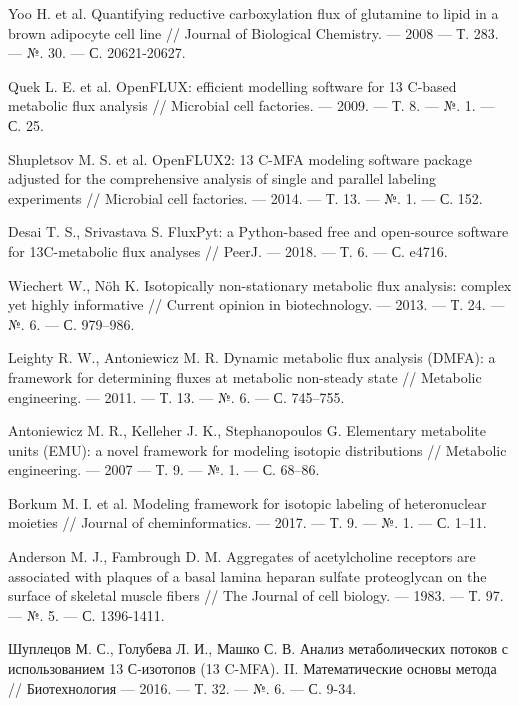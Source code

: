 \documentclass[14pt, a4paper]{extreport}
\begin{document}
\begin{thebibliography}{XXXX}
	Yoo H. et al. Quantifying reductive carboxylation flux of glutamine to lipid in a brown adipocyte cell line // Journal of Biological Chemistry. --- 2008 --- Т. 283. --- №. 30. --- С. 20621-20627.
	
	Quek L. E. et al. OpenFLUX: efficient modelling software for 13 C-based metabolic flux analysis // Microbial cell factories. --- 2009. --- Т. 8. --- №. 1. --- С. 25.
	
	Shupletsov M. S. et al. OpenFLUX2: 13 C-MFA modeling software package adjusted for the comprehensive analysis of single and parallel labeling experiments // Microbial cell factories. --- 2014. --- Т. 13. --- №. 1. --- С. 152.
	
	Desai T. S., Srivastava S. FluxPyt: a Python-based free and open-source software for 13C-metabolic flux analyses // PeerJ. --- 2018. --- Т. 6. --- С. e4716.
	
	Wiechert W., Nöh K. Isotopically non-stationary metabolic flux analysis: complex yet highly informative // Current opinion in biotechnology. --- 2013. --- Т. 24. --- №. 6. --- С. 979--986.
	
	Leighty R. W., Antoniewicz M. R. Dynamic metabolic flux analysis (DMFA): a framework for determining fluxes at metabolic non-steady state // Metabolic engineering. --- 2011. --- Т. 13. --- №. 6. --- С. 745--755.

	Antoniewicz M. R., Kelleher J. K., Stephanopoulos G. Elementary metabolite units (EMU): a novel framework for modeling isotopic distributions // Metabolic engineering. --- 2007 --- Т. 9. --- №. 1. --- С. 68--86.
	
	Borkum M. I. et al. Modeling framework for isotopic labeling of heteronuclear moieties // Journal of cheminformatics. --- 2017. --- Т. 9. --- №. 1. --- С. 1--11.

	
	Anderson M. J., Fambrough D. M. Aggregates of acetylcholine receptors are associated with plaques of a basal lamina heparan sulfate proteoglycan on the surface of skeletal muscle fibers // The Journal of cell biology. --- 1983. --- Т. 97. --- №. 5. --- С. 1396-1411.
	
	Шуплецов М. С., Голубева Л. И., Машко С. В. Анализ метаболических потоков с использованием 13 С-изотопов (13 C-MFA). II. Математические основы метода // Биотехнология --- 2016. --- Т. 32. --- №. 6. --- С. 9-34.
	

\end{thebibliography}
\end{document}
